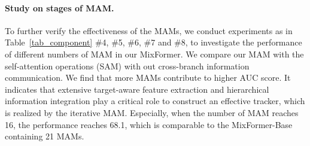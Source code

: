 \vspace{-2mm}
\paragraph{Study on stages of MAM.}
To further verify the effectiveness of the MAMs, we conduct experiments as in Table~\ref{tab_component} \#4, \#5, \#6, \#7 and \#8, to investigate the performance of different numbers of MAM in our MixFormer. We compare our MAM with the self-attention operations (SAM) with out cross-branch information communication. We find that more MAMs contribute to higher AUC score.
It indicates that extensive target-aware feature extraction and hierarchical information integration play a critical role to construct an effective tracker, which is realized by the iterative MAM. Especially, when the number of MAM reaches 16, the performance reaches 68.1, which is comparable to the MixFormer-Base containing 21 MAMs.
\begin{table}[pt]
    \centering
    \vspace{-2mm}
    \caption{Ablation for asymmetric mixed attention mechanism.}
\vspace{-1mm}
\label{tab_asym}
\end{table}

\begin{table}[pt]
\small
    \centering
    \vspace{-2mm}
    \caption{Ablation for online templates update mechanism.}
    \label{tab_online}
\vspace{-1mm}
\end{table}

